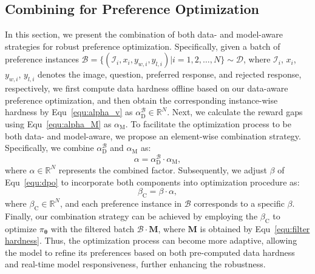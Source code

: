 \subsection{Combining for Preference Optimization}
\label{subsec:combination}
In this section, we present the combination of both data- and model-aware strategies for robust preference optimization.
Specifically, given a batch of preference instances $\mathcal{B} = \{ (\mathcal{I}_{i}, x_{i}, y_{w, i}, y_{l, i}) | i = 1,2,\dots, N \} \sim \mathcal{D}$, where $\mathcal{I}_{i}$, $x_{i}$, $y_{w, i}$, $y_{l, i}$ denotes the image, question, preferred response, and rejected response, respectively,
we first compute data hardness offline based on our data-aware preference optimization, and then obtain the corresponding instance-wise hardness by Equ~\eqref{equ:alpha_v} as $\alpha_{\mathrm{D}}^{\mathcal{B}} \in \mathbb{R}^{N}$. 
Next, we calculate the reward gaps using Equ~\ref{equ:alpha_M} as $\alpha_{\text{M}}$.
To facilitate the optimization process to be both data- and model-aware, we propose an element-wise combination strategy. Specifically, we combine $\alpha_{\mathrm{D}}^{\mathcal{B}}$ and $\alpha_{\text{M}}$ as:
\begin{equation}
    \label{equ:alpha}
    \alpha = \alpha_{\mathrm{D}}^{\mathcal{B}} \cdot \alpha_{\text{M}},
\end{equation}
where $\alpha \in \mathbb{R}^{N}$ represents the combined factor. 
Subsequently, we adjust $\beta$ of Equ~\eqref{equ:dpo} to incorporate both components into optimization procedure as:
\begin{equation}
    \label{equ:update beta all}
        \beta_{\text{C}} = \beta \cdot \alpha,
    \end{equation}
where $\beta_{\text{C}} \in \mathbb{R}^{N}$, and each preference instance in $\mathcal{B}$ corresponds to a specific $\beta$. 
Finally, our combination strategy can be achieved by employing the $\beta_{\text{C}}$ to optimize $\pi_{\bm{\theta}}$ with the filtered batch $\mathcal{B} \cdot \bm{M}$, where $\bm{M}$ is obtained by Equ~\eqref{equ:filter hardness}.
Thus, the optimization process can become more adaptive, allowing the model to refine its preferences based on both pre-computed data hardness and real-time model responsiveness, further enhancing the robustness.

